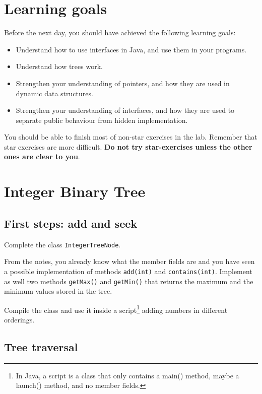 \documentclass{article}
\begin{document}
\section*{Learning goals}
\label{sec:learning-goals}

Before the next day, you should have achieved the following learning
goals: 

\begin{itemize}
\item Understand how to use interfaces in Java, and use them in your
  programs. 
\item Understand how trees work.
\item Strengthen your understanding of pointers, and how they are used
  in dynamic data structures. 
\item Strengthen your understanding of interfaces, and how they are used
  to separate public behaviour from hidden implementation. 
\end{itemize}

You should be able to finish most of non-star exercises in the lab. 
Remember that star exercises are more difficult. 
\textbf{Do not try star-exercises unless the other ones are clear to
  you}.  

\section{Integer Binary Tree}
\label{sec:queues}

\subsection{First steps: add and seek}
\label{sec:first-steps:-add}

Complete the class \verb+IntegerTreeNode+. 

From the notes, you already know what the member fields are and you
have seen a possible implementation of methods \verb+add(int)+ and
\verb+contains(int)+. Implement as well two methods \verb+getMax()+
and \verb+getMin()+ that returns the maximum and the minimum values
stored in the tree. 

Compile the class and use it inside a script\footnote{In Java, a script
  is a class that only contains a main() method, maybe a launch()
  method, and no member fields.} adding numbers in different
orderings. 

\subsection{Tree traversal}
\label{sec:tree-traversal}
\end{document}
